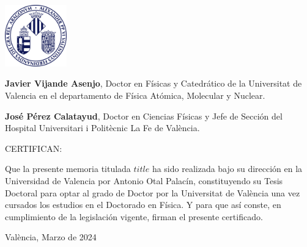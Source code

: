 \newpage
\thispagestyle{empty}
\begin{flushright}
\end{flushright}

\vspace*{-3cm}
\includegraphics[width=0.2\textwidth]{logouni} %

\vspace{4ex}

\justify

\textbf{Javier Vijande Asenjo}, Doctor en Físicas y Catedrático de la Universitat de Valencia en el departamento de Física Atómica, Molecular y Nuclear.

\vspace{3ex}

\justify

\textbf{José Pérez Calatayud}, Doctor en Ciencias Físicas y Jefe de Sección del Hospital Universitari i Politècnic La Fe de València.

\vspace{5ex}

{\Large CERTIFICAN: }

\vspace{3ex}

\justify

Que la presente memoria titulada \emph{$title$} ha
sido realizada bajo su dirección en la Universidad de Valencia por Antonio Otal Palacín, constituyendo su Tesis Doctoral para optar al grado de Doctor por la
Universitat de València una vez cursados los estudios en el Doctorado en Física. Y para
que así conste, en cumplimiento de la legislación vigente, firman el presente certificado.

\vspace{3ex}

\justify

València, Marzo de 2024

\vspace{5ex}


